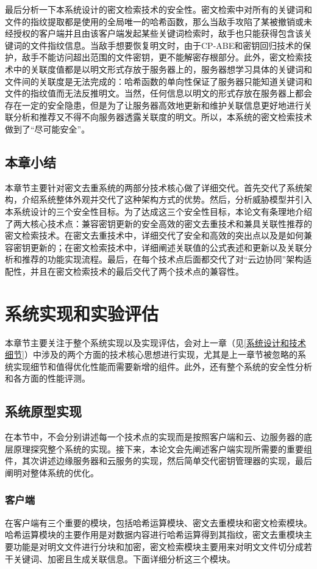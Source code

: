 \documentclass[promaster]{thesis-uestc}
\begin{document}
最后分析一下本系统设计的密文检索技术的安全性。密文检索中对所有的关键词和文件的指纹提取都是使用的全局唯一的哈希函数，那么当敌手攻陷了某被撤销或未经授权的客户端并且由该客户端发起某些关键词检索时，敌手也只能获得包含该关键词的文件指纹信息。当敌手想要恢复明文时，由于CP-ABE和密钥回归技术的保护，敌手不能访问超出范围的文件密钥，更不能解密存根部分。此外，密文检索技术中的关联度值都是以明文形式存放于服务器上的，服务器想学习具体的关键词和文件间的关联度是无法完成的：哈希函数的单向性保证了服务器只能知道关键词和文件的指纹值而无法反推明文。当然，任何信息以明文的形式存放在服务器上都会存在一定的安全隐患，但是为了让服务器高效地更新和维护关联信息更好地进行关联分析和推荐又不得不向服务器透露关联度的明文。所以，本系统的密文检索技术做到了“尽可能安全”。

\section{本章小结}
本章节主要针对密文去重系统的两部分技术核心做了详细交代。首先交代了系统架构，介绍系统整体外观并交代了这种架构方式的优势。然后，分析威胁模型并引入本系统设计的三个安全性目标。为了达成这三个安全性目标，本论文有条理地介绍了两大核心技术点：兼容密钥更新的安全高效的密文去重技术和兼具关联性推荐的密文检索技术。在密文去重技术中，详细交代了安全和高效的突出点以及是如何兼容密钥更新的；在密文检索技术中，详细阐述关联值的公式表述和更新以及关联分析和推荐的功能实现流程。最后，在每个技术点后面都交代了对“云边协同”架构适配性，并且在密文检索技术的最后交代了两个技术点的兼容性。
\chapter{系统实现和实验评估}
本章节主要关注于整个系统实现以及实现评估，会对上一章（见\ref{系统设计和技术细节}）中涉及的两个方面的技术核心思想进行实现，尤其是上一章节被忽略的系统实现细节和值得优化性能而需要新增的组件。此外，还有整个系统的安全性分析和各方面的性能评测。

\section{系统原型实现}
在本节中，不会分别讲述每一个技术点的实现而是按照客户端和云、边服务器的底层原理探究整个系统的实现。接下来，本论文会先阐述客户端实现所需要的重要组件，其次讲述边缘服务器和云服务的实现，然后简单交代密钥管理器的实现，最后阐明对整体系统的优化。
\subsection{客户端}\label{客户端}
在客户端有三个重要的模块，包括哈希运算模块、密文去重模块和密文检索模块。哈希运算模块的主要作用是对数据内容进行哈希运算得到其指纹，密文去重模块主要功能是对明文文件进行分块和加密，密文检索模块主要用来对明文文件切分成若干关键词、加密且生成关联信息。下面详细分析这三个模块。
\end{document}
